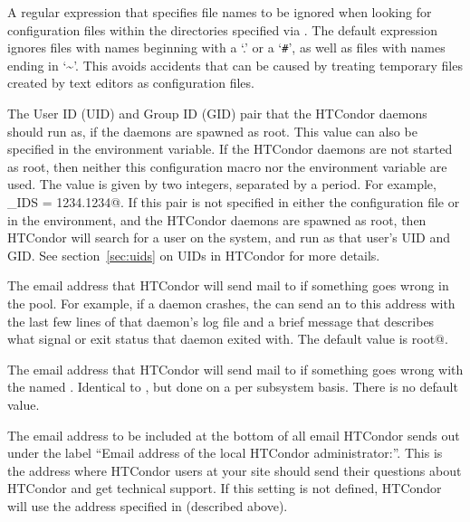 \begin{description}
\label{param:LocalConfigDirExcludeRegexp}
\item[\Macro{LOCAL\_CONFIG\_DIR\_EXCLUDE\_REGEXP}]
  A regular expression that specifies file names to be ignored when
  looking for configuration files within the directories specified via
  .  The default expression ignores files
  with names beginning with a `.' or a `\verb|#|', as well as files with names
  ending in `\~{}'.  This avoids accidents that can be caused by
  treating temporary files created by text editors as configuration
  files.

\label{param:CondorIds}
\item[\Macro{CONDOR\_IDS}]
  The User ID (UID) and Group ID (GID) pair that the HTCondor daemons
  should run as, if the daemons are spawned as root.
  This value can also be specified in the 
  environment variable.
  If the HTCondor daemons are not started as root, then neither this
   configuration macro nor the 
  environment variable are used.
  The value is given by two integers, separated by a period.  For
  example, \verb@CONDOR_IDS = 1234.1234@.
  If this pair is not specified in either the configuration file or in the
  environment, and the HTCondor daemons are spawned as root,
  then HTCondor will
  search for a \verb@condor@ user on the system, and run as that user's
  UID and GID.
  See section~\ref{sec:uids} on UIDs in HTCondor for more details.

\label{param:CondorAdmin}
\item[\Macro{CONDOR\_ADMIN}]
  The email address that HTCondor will send mail to if something goes wrong in
  the pool.  For example, if a daemon crashes, the 
  can send an  to this address with the last few lines
  of that daemon's log file and a brief message that describes what
  signal or exit status that daemon exited with.
  The default value is root@.

\label{param:SubsysAdminEmail}
\item[\MacroB{<SUBSYS>\_ADMIN\_EMAIL}]
  The email address that HTCondor will send mail to if something goes wrong
  with the named .  Identical to ,
  but done on a per subsystem basis. There is no default value.
  
\label{param:CondorSupportEmail}
\item[\Macro{CONDOR\_SUPPORT\_EMAIL}]
  The email address to be included at the bottom of all email HTCondor
  sends out under the label ``Email address of the local HTCondor
  administrator:''.  
  This is the address where HTCondor users at your site should send
  their questions about HTCondor and get technical support.
  If this setting is not defined, HTCondor will use the address
  specified in  (described above).


\end{description}

